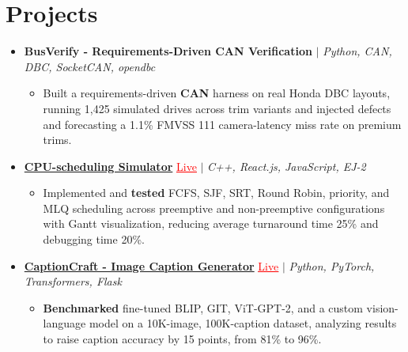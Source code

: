 \documentclass[letterpaper,10pt]{article}
\newcommand{\itemTail}{\vspace{-4pt}}
\newcommand{\projGap}{\vspace{3pt}}
\newcommand{\resumeItem}[1]{\item\small{{#1 \itemTail}}}
\newcommand{\resumeProjectHeading}[1]{\item \small #1 \vspace{-2pt}}
\newcommand{\resumeProjectLink}[2]{\href{#1}{\textcolor{red}{\underline{#2}}}}
\newcommand{\resumeSubHeadingListStart}{\begin{itemize}[leftmargin=0.0in, label={}]}
\newcommand{\resumeSubHeadingListEnd}{\end{itemize}}
\newcommand{\resumeProjItemListStart}{\begin{itemize}[leftmargin=0.15in,label=\textbullet,itemsep=3pt,topsep=0pt,parsep=0pt,partopsep=0pt]}
\newcommand{\resumeProjItemListEnd}{\end{itemize}\vspace{-4pt}}
\begin{document}
\section{Projects}
\resumeSubHeadingListStart
\vspace{3pt}
\resumeProjectHeading{\textbf{BusVerify - Requirements-Driven CAN Verification} $|$ \emph{Python, CAN, DBC, SocketCAN, opendbc}}
\resumeProjItemListStart
\resumeItem{Built a requirements-driven \textbf{CAN} harness on real Honda DBC layouts, running 1,425 simulated drives across trim variants and injected defects and forecasting a 1.1\% FMVSS 111 camera-latency miss rate on premium trims.}
\resumeProjItemListEnd
\projGap
\resumeProjectHeading{\href{https://cpu-scheduler-amber.vercel.app/}{\textbf{CPU-scheduling Simulator}} \resumeProjectLink{https://cpu-scheduler-amber.vercel.app/}{Live} $|$ \emph{C++, React.js, JavaScript, EJ-2}}
\resumeProjItemListStart
\resumeItem{Implemented and \textbf{tested} FCFS, SJF, SRT, Round Robin, priority, and MLQ scheduling across preemptive and non-preemptive configurations with Gantt visualization, reducing average turnaround time 25\% and debugging time 20\%.}
\resumeProjItemListEnd
\projGap
\resumeProjectHeading{\href{https://imagecaptiongenerator.com/}{\textbf{CaptionCraft - Image Caption Generator}} \resumeProjectLink{https://imagecaptiongenerator.com/}{Live} $|$ \emph{Python, PyTorch, Transformers, Flask}}
\resumeProjItemListStart
\resumeItem{\textbf{Benchmarked} fine-tuned BLIP, GIT, ViT-GPT-2, and a custom vision-language model on a 10K-image, 100K-caption dataset, analyzing results to raise caption accuracy by 15 points, from 81\% to 96\%.}
\resumeProjItemListEnd
\resumeSubHeadingListEnd
\end{document}
